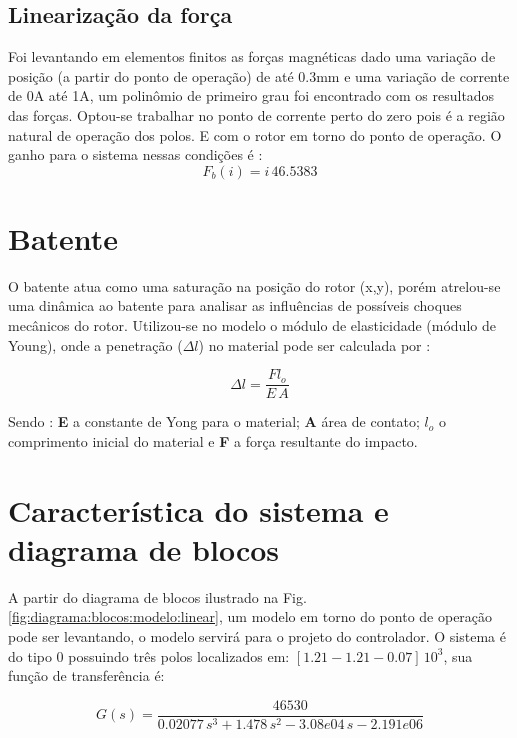 \subsection{Linearização da força}

Foi levantando em elementos finitos as forças magnéticas dado uma variação de posição (a partir do ponto de operação) de até 0.3mm e uma variação de corrente de 0A até 1A, um polinômio de primeiro grau foi encontrado com os resultados das forças. Optou-se trabalhar no ponto de corrente perto do zero pois é a região natural de operação dos polos. E com o rotor em torno do ponto de operação. O ganho para o sistema nessas condições é :
\begin{equation}
     F_b(i) = i \,    46.5383 
\end{equation}

\section{Batente}

O batente atua como uma saturação na posição do rotor (x,y), porém atrelou-se uma dinâmica ao batente para analisar as influências de possíveis choques mecânicos do rotor. Utilizou-se no  modelo o módulo de elasticidade (módulo de Young), onde a penetração ($\Delta l $) no material pode ser calculada por :

\begin{equation}
	\Delta l =  \frac{F l_o}{E \, A}
\end{equation}

Sendo : \textbf{E }a constante de Yong para o material; \textbf{A} área de contato; \textbf{$l_o$ } o comprimento inicial do material e \textbf{F} a força resultante do impacto. 

\section{Característica do sistema e diagrama de blocos}

A partir do diagrama de blocos ilustrado na Fig. \ref{fig:diagrama:blocos:modelo:linear}, um modelo em torno do ponto de operação pode ser levantando, o modelo servirá para o projeto do controlador. O sistema é do tipo 0 possuindo três polos localizados em:  $[1.21 -1.21 -0.07] \, 10^ 3$, sua função de transferência é:

\begin{equation}
G(s) = \frac{46530}{ 0.02077 \, s^3 + 1.478 \, s^2 - 3.08e04 \,s - 2.191e06}
\end{equation}

